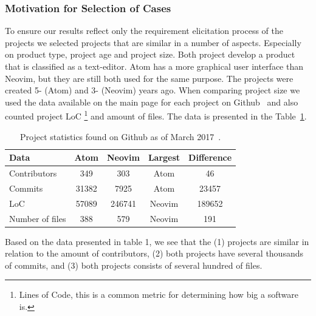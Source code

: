 \documentclass[a4paper,11pt]{article}
\begin{document}
{\subsubsection{Motivation for Selection of Cases}
\label{sec:case_selection}
To ensure our results reflect only the requirement elicitation process of the projects we selected projects that are similar in a number of aspects. Especially on product type, project age and project size. Both project develop a product that is classified as a text-editor. Atom has a more graphical user interface than Neovim, but they are still both used for the same purpose. The projects were created 5- (Atom) and 3- (Neovim) years ago. When comparing project size we used the data available on the main page for each project on Github~\cite{atom_pp,neovim_pp} and also counted project LoC \footnote{Lines of Code, this is a common metric for determining how big a software is.} and amount of files. The data is presented in the Table~\ref{tab:github_stats}.

\begin{table}[h]
	\centering
	\begin{tabular}{ | l | c | c | c | c |}
		\hline
		\textbf{Data} 			& \textbf{Atom} 	& \textbf{Neovim}	& \textbf{Largest}	& \textbf{Difference}	\\\hline
		Contributors	 		& 349 		& 303 			& Atom			& 46				\\\hline
		Commits		 		& 31382 		& 7925 			& Atom			& 23457			\\\hline
		LoC 					& 57089		& 246741			& Neovim			& 189652			\\\hline
		Number of files 			& 388		& 579		 	& Neovim			& 191			\\
		\hline
	\end{tabular}
	\caption{Project statistics found on Github as of March 2017~\cite{atom_pp,neovim_pp}.}
	\label{tab:github_stats}
\end{table}

\FloatBarrier
Based on the data presented in table 1, we see that the (1) projects are similar in relation to the amount of contributors, (2) both projects have several thousands of commits, and (3) both projects consists of several hundred of files.

}
\end{document}
